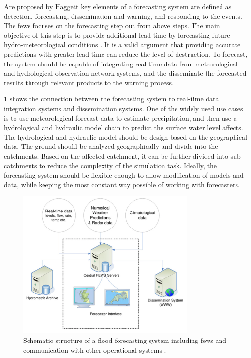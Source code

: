 Are proposed by Haggett \cite{Haggett1998AnWales} key elements of a forecasting system are defined as detection, forecasting, dissemination and warning, and responding to the events. The \acrshort{fews} focuses on the forecasting step out from above steps. The main objective of this step is to provide additional lead time by forecasting future hydro-meteorological conditions \cite{Werner2005FloodCatchments}. It is a valid argument that providing accurate predictions with greater lead time can reduce the level of destruction. To forecast, the system should be capable of integrating real-time data from meteorological and hydrological observation network systems, and the disseminate the forecasted results through relevant products to the warning process.

\cref{fi:fews_schematic} shows the connection between the forecasting system to real-time data integration systems and dissemination systems. One of the widely used use cases is to use meteorological forecast data to estimate precipitation, and then use a hydrological and hydraulic model chain to predict the surface water level affects. The hydrological and hydraulic model should be design based on the geographical data. The ground should be analyzed geographically and divide into the catchments. Based on the affected catchment, it can be further divided into sub-catchments to reduce the complexity of the simulation task. Ideally, the forecasting system should be flexible enough to allow modification of models and data, while keeping the most constant way possible of working with forecasters.

\begin{figure}[htp]
    \centering
    \includegraphics[width=0.8\textwidth]{lit/fews/Schematic-structure-of-a-fl-ood-forecasting-system-showing-the-position-of-Delft-FEWS_W640.png}
    \caption[Schematic structure of a flood forecasting system including \acrshort{fews} and communication among other operational systems]{Schematic structure of a flood forecasting system including \acrshort{fews} and communication with other operational systems \cite{Werner2013TheSystem}.}
    \label{fi:fews_schematic}
\end{figure}


